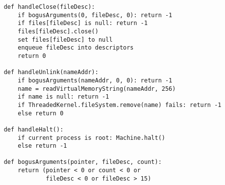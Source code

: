 \documentclass{article}
\begin{document}
\begin{verbatim}
    def handleClose(fileDesc):
        if bogusArguments(0, fileDesc, 0): return -1
        if files[fileDesc] is null: return -1
        files[fileDesc].close()
        set files[fileDesc] to null
        enqueue fileDesc into descriptors
        return 0

    def handleUnlink(nameAddr):
        if bogusArguments(nameAddr, 0, 0): return -1
        name = readVirtualMemoryString(nameAddr, 256)
        if name is null: return -1
        if ThreadedKernel.fileSystem.remove(name) fails: return -1
        else return 0

    def handleHalt():
        if current process is root: Machine.halt()
        else return -1

    def bogusArguments(pointer, fileDesc, count):
        return (pointer < 0 or count < 0 or
                fileDesc < 0 or fileDesc > 15)
\end{verbatim}
\end{document}
